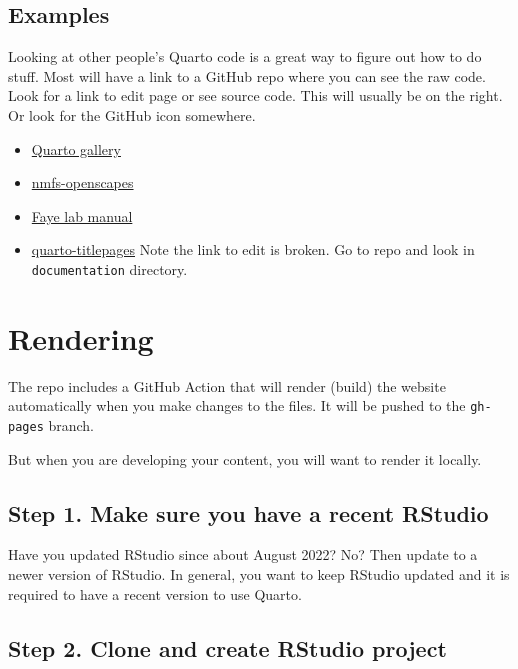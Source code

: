 \documentclass[
  letterpaper,
  oneside,
  open=any]{scrbook}
\providecommand{\tightlist}{%
  \setlength{\itemsep}{0pt}\setlength{\parskip}{0pt}}\usepackage{longtable,booktabs,array}
\begin{document}
\section{Examples}\label{examples}

Looking at other people's Quarto code is a great way to figure out how
to do stuff. Most will have a link to a GitHub repo where you can see
the raw code. Look for a link to edit page or see source code. This will
usually be on the right. Or look for the GitHub icon somewhere.

\begin{itemize}
\tightlist
\item
  \href{https://quarto.org/docs/gallery/}{Quarto gallery}
\item
  \href{https://nmfs-openscapes.github.io/}{nmfs-openscapes}
\item
  \href{https://thefaylab.github.io/lab-manual/}{Faye lab manual}
\item
  \href{https://nmfs-opensci.github.io/quarto_titlepages/}{quarto-titlepages}
  Note the link to edit is broken. Go to repo and look in
  \texttt{documentation} directory.
\end{itemize}


\chapter{Rendering}\label{rendering}

The repo includes a GitHub Action that will render (build) the website
automatically when you make changes to the files. It will be pushed to
the \texttt{gh-pages} branch.

But when you are developing your content, you will want to render it
locally.

\section{Step 1. Make sure you have a recent
RStudio}\label{step-1.-make-sure-you-have-a-recent-rstudio}

Have you updated RStudio since about August 2022? No? Then update to a
newer version of RStudio. In general, you want to keep RStudio updated
and it is required to have a recent version to use Quarto.

\section{Step 2. Clone and create RStudio
project}\label{step-2.-clone-and-create-rstudio-project}
\end{document}
